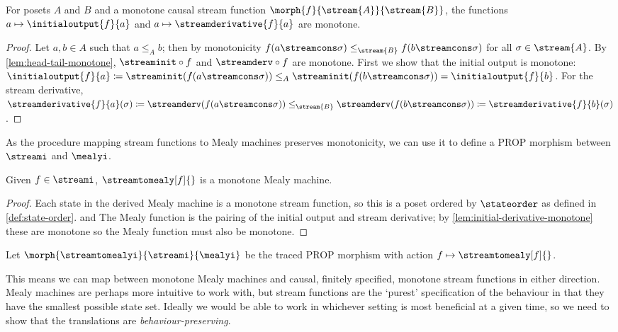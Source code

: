 \documentclass{lmcs}
\begin{document}
\begin{lem}\label{lem:initial-derivative-monotone}
    For posets \(A\) and \(B\) and a monotone causal stream function
    \(\morph{f}{\stream{A}}{\stream{B}}\), the functions
    \(a \mapsto \initialoutput{f}{a}\) and \(a \mapsto \streamderivative{f}{a}\)
    are monotone.
\end{lem}
\begin{proof}
    Let \(a, b \in A\) such that \(a \leq_A b\); then by monotonicity
    \(f(a \streamcons \sigma) \leq_{\stream{B}} f(b \streamcons \sigma)\) for
    all \(\sigma \in \stream{A}\).
    By \autoref{lem:head-tail-monotone}, \(\streaminit \circ f\) and
    \(\streamderv \circ f\) are monotone.
    First we show that the initial output is monotone: \(
    \initialoutput{f}{a} \coloneqq
    \streaminit(f(a \streamcons \sigma)) \leq_{A}
    \streaminit(f(b \streamcons \sigma)) =
    \initialoutput{f}{b}
    \).
    For the stream derivative, \(
    \streamderivative{f}{a}(\sigma) \coloneqq
    \streamderv(f(a \streamcons \sigma)) \leq_{\stream{B}}
    \streamderv(f(b \streamcons \sigma)) \coloneqq
    \streamderivative{f}{b}(\sigma)
    \).
\end{proof}

As the procedure mapping stream functions to Mealy machines preserves
monotonicity, we can use it to define a PROP morphism between \(\streami\) and
\(\mealyi\).

\begin{lem}\label{lem:stream-to-mealy-is-monotone}
    Given \(f \in \streami\), \(\streamtomealy[f]{}\) is
    a monotone Mealy machine.
\end{lem}
\begin{proof}
    Each state in the derived Mealy machine is a monotone stream function, so
    this is a poset ordered by \(\stateorder\) as defined in
    \autoref{def:state-order}. and
    The Mealy function is the pairing of the initial output and stream
    derivative; by \autoref{lem:initial-derivative-monotone} these are monotone so
    the Mealy function must also be monotone.
\end{proof}

\begin{defi}
    Let \(\morph{\streamtomealyi}{\streami}{\mealyi}\) be the traced PROP
    morphism with action \(f \mapsto \streamtomealy[f]{}\).
\end{defi}

This means we can map between monotone Mealy machines and causal, finitely
specified, monotone stream functions in either direction.
Mealy machines are perhaps more intuitive to work with, but stream functions
are the `purest' specification of the behaviour in that they have the smallest
possible state set.
Ideally we would be able to work in whichever setting is most beneficial at a
given time, so we need to show that the translations are
\emph{behaviour-preserving}.
\end{document}
